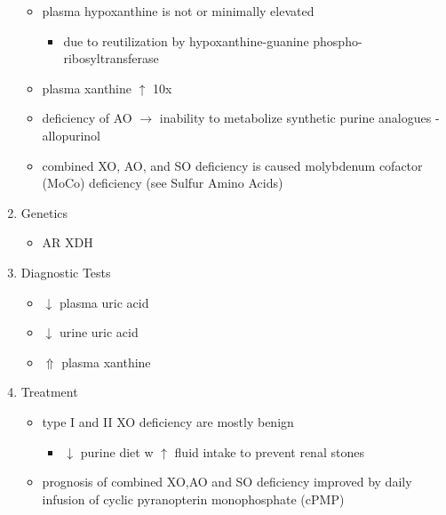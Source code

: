 \documentclass[12pt]{scrartcl}
\begin{document}
\begin{enumerate}

\begin{itemize}
\item plasma hypoxanthine is not or minimally elevated
\begin{itemize}
\item due to reutilization by hypoxanthine-guanine phospho-ribosyltransferase
\end{itemize}
\item plasma xanthine \(\uparrow\) 10x
\item deficiency of AO \(\to\) inability to metabolize synthetic purine
analogues - allopurinol
\item combined XO, AO, and SO deficiency is caused molybdenum cofactor
(MoCo) deficiency (see Sulfur Amino Acids)
\end{itemize}

\item Genetics
\label{sec:orgd1bcb2c}
\begin{itemize}
\item AR XDH
\end{itemize}

\item Diagnostic Tests
\label{sec:org5b967be}
\begin{itemize}
\item \(\downarrow\) plasma uric acid
\item \(\downarrow\) urine uric acid
\item \(\Uparrow\) plasma xanthine
\end{itemize}

\item Treatment
\label{sec:org553038c}
\begin{itemize}
\item type I and II XO deficiency are mostly benign
\begin{itemize}
\item \(\downarrow\) purine diet w \(\uparrow\) fluid intake to prevent renal stones
\end{itemize}
\item prognosis of combined XO,AO and SO deficiency improved by daily
infusion of cyclic pyranopterin monophosphate (cPMP)
\end{itemize}
\end{enumerate}
\end{document}
